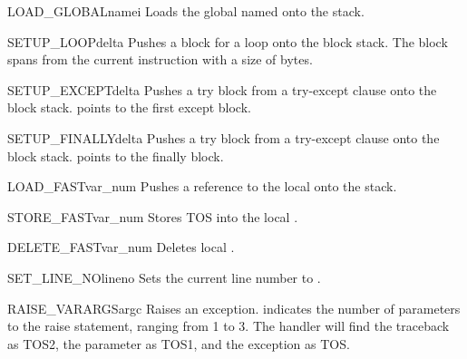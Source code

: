 \begin{funcdesc}{LOAD_GLOBAL}{namei}
Loads the global named  onto the stack.
\end{funcdesc}


\begin{funcdesc}{SETUP_LOOP}{delta}
Pushes a block for a loop onto the block stack.  The block spans
from the current instruction with a size of  bytes.
\end{funcdesc}

\begin{funcdesc}{SETUP_EXCEPT}{delta}
Pushes a try block from a try-except clause onto the block stack.
 points to the first except block.
\end{funcdesc}

\begin{funcdesc}{SETUP_FINALLY}{delta}
Pushes a try block from a try-except clause onto the block stack.
 points to the finally block.
\end{funcdesc}

\begin{funcdesc}{LOAD_FAST}{var_num}
Pushes a reference to the local  onto
the stack.
\end{funcdesc}

\begin{funcdesc}{STORE_FAST}{var_num}
Stores TOS into the local .
\end{funcdesc}

\begin{funcdesc}{DELETE_FAST}{var_num}
Deletes local .
\end{funcdesc}

\begin{funcdesc}{SET_LINE_NO}{lineno}
Sets the current line number to .
\end{funcdesc}

\begin{funcdesc}{RAISE_VARARGS}{argc}
Raises an exception.  indicates the number of parameters
to the raise statement, ranging from 1 to 3.  The handler will find
the traceback as TOS2, the parameter as TOS1, and the exception
as TOS.
\end{funcdesc}

